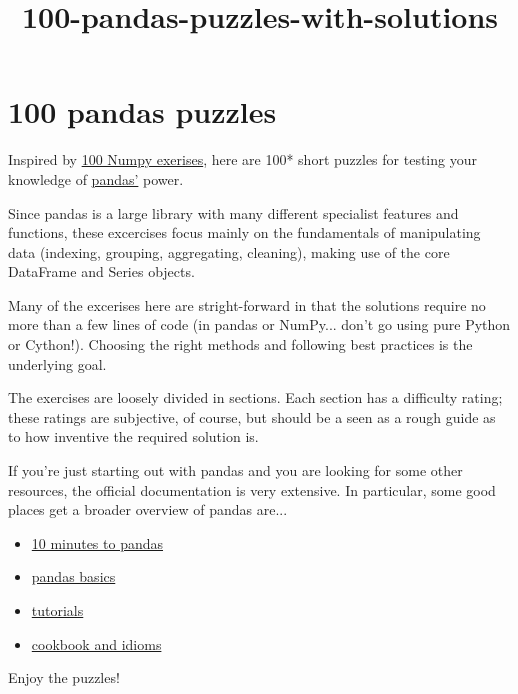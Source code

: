 \documentclass[11pt]{article}
\title{100-pandas-puzzles-with-solutions}
\providecommand{\tightlist}{%
      \setlength{\itemsep}{0pt}\setlength{\parskip}{0pt}}
\begin{document}
    
    
    \maketitle
    
    

    
    \section{100 pandas puzzles}\label{pandas-puzzles}

Inspired by \href{https://github.com/rougier/numpy-100}{100 Numpy
exerises}, here are 100* short puzzles for testing your knowledge of
\href{http://pandas.pydata.org/}{pandas'} power.

Since pandas is a large library with many different specialist features
and functions, these excercises focus mainly on the fundamentals of
manipulating data (indexing, grouping, aggregating, cleaning), making
use of the core DataFrame and Series objects.

Many of the excerises here are stright-forward in that the solutions
require no more than a few lines of code (in pandas or NumPy... don't go
using pure Python or Cython!). Choosing the right methods and following
best practices is the underlying goal.

The exercises are loosely divided in sections. Each section has a
difficulty rating; these ratings are subjective, of course, but should
be a seen as a rough guide as to how inventive the required solution is.

If you're just starting out with pandas and you are looking for some
other resources, the official documentation is very extensive. In
particular, some good places get a broader overview of pandas are...

\begin{itemize}
\tightlist
\item
  \href{http://pandas.pydata.org/pandas-docs/stable/10min.html}{10
  minutes to pandas}
\item
  \href{http://pandas.pydata.org/pandas-docs/stable/basics.html}{pandas
  basics}
\item
  \href{http://pandas.pydata.org/pandas-docs/stable/tutorials.html}{tutorials}
\item
  \href{http://pandas.pydata.org/pandas-docs/stable/cookbook.html\#cookbook}{cookbook
  and idioms}
\end{itemize}

Enjoy the puzzles!
\end{document}

